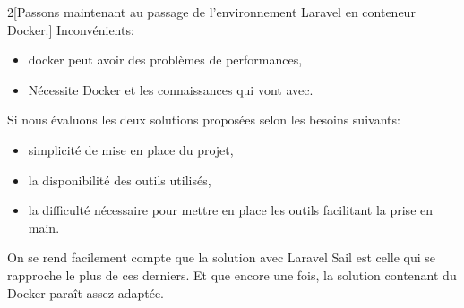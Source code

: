 \documentclass[
    iai, %
    il, %
]{heig-tb}
\begin{document}
\begin{multicols}{2}[Passons maintenant au passage de l'environnement Laravel en conteneur Docker.]
    Inconvénients:
    \begin{itemize}
        \item \Gls{docker} peut avoir des problèmes de performances, \cite{labrecque}
        \item Nécessite Docker et les connaissances qui vont avec. \cite{labrecque}
    \end{itemize}
\end{multicols}

Si nous évaluons les deux solutions proposées selon les besoins suivants:
\begin{itemize}
    \item simplicité de mise en place du projet,
    \item la disponibilité des outils utilisés,
    \item la difficulté nécessaire pour mettre en place les outils facilitant la prise en main.
\end{itemize}

On se rend facilement compte que la solution avec Laravel Sail est celle qui se rapproche le plus de ces derniers. Et que encore une fois, la solution contenant du Docker paraît assez adaptée.

\end{document}
